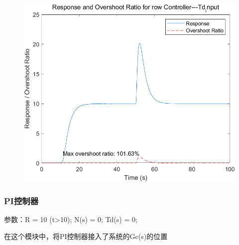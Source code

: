 \documentclass{thuemp}
\begin{document}
\begin{figure}[H]
\centering
\includegraphics[width=1\linewidth]{./img/None_p2_Td.png}
\end{figure}

\subsubsection{PI控制器}
参数：R = 10 (t>10);  N(s) = 0;  Td(s) = 0;

在这个模块中，将PI控制器接入了系统的Gc(s)的位置
\end{document}
